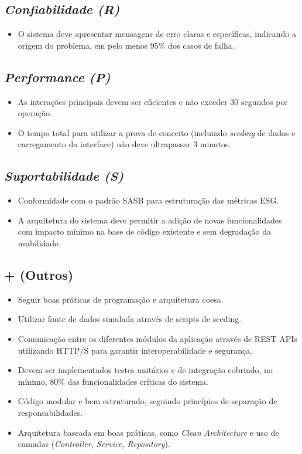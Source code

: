 \subsection{\textit{Confiabilidade (R)}}
\begin{itemize}
    \item O sistema deve apresentar mensagens de erro claras e específicas, indicando a origem do problema, em pelo menos 95\% dos casos de falha.
\end{itemize}

\subsection{\textit{Performance (P)}}
\begin{itemize}
    \item As interações principais devem ser eficientes e não exceder 30 segundos por operação.
    \item O tempo total para utilizar a prova de conceito (incluindo \textit{seeding} de dados e carregamento da interface) não deve ultrapassar 3 minutos.
\end{itemize}

\subsection{\textit{Suportabilidade (S)}}
\begin{itemize}
    \item Conformidade com o padrão \gls{SASB} para estruturação das métricas \gls{ESG}.
    \item A arquitetura do sistema deve permitir a adição de novas funcionalidades com impacto mínimo na base de código existente e sem degradação da usabilidade.
\end{itemize}

\subsection{+ (Outros)}
\begin{itemize}
    \item Seguir boas práticas de programação e arquitetura coesa.
    \item Utilizar fonte de dados simulada através de scripts de seeding.
    \item Comunicação entre os diferentes módulos da aplicação através de REST APIs utilizando HTTP/S para garantir interoperabilidade e segurança.
    \item Devem ser implementados testes unitários e de integração cobrindo, no mínimo, 80\% das funcionalidades críticas do sistema.
    \item Código modular e bem estruturado, seguindo princípios de separação de responsabilidades.
    \item Arquitetura baseada em boas práticas, como \textit{Clean Architecture} e uso de camadas (\textit{Controller, Service, Repository}).
\end{itemize}

